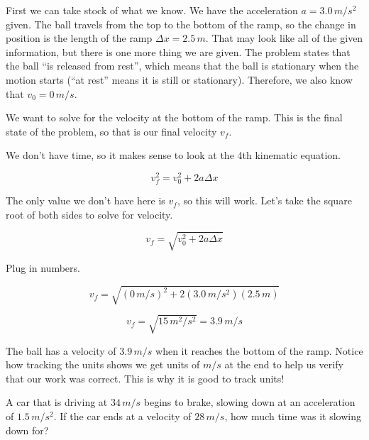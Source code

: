 \documentclass[12pt]{book}
\begin{document}
\hspace{10pt}

First we can take stock of what we know. We have the acceleration $a = 3.0 \, m/s^2$ given. The ball travels from the top to the bottom of the ramp, so the change in position is the length of the ramp $\Delta x = 2.5 \, m$. That may look like all of the given information, but there is one more thing we are given. The problem states that the ball ``is released from rest'', which means that the ball is stationary when the motion starts (``at rest'' means it is still or stationary). Therefore, we also know that $v_0 = 0 \, m/s$.

We want to solve for the velocity at the bottom of the ramp. This is the final state of the problem, so that is our final velocity $v_f$.

We don't have time, so it makes sense to look at the 4th kinematic equation.

\begin{equation}
v_f^2 = v_0^2 + 2 a \Delta x
\end{equation}

The only value we don't have here is $v_f$, so this will work. Let's take the square root of both sides to solve for velocity.

\begin{equation}
v_f = \sqrt{v_0^2 + 2 a \Delta x}
\end{equation}

Plug in numbers.

\begin{equation}
v_f = \sqrt{(0 \, m/s)^2 + 2 (3.0 \, m/s^2) (2.5 \, m)}
\end{equation}

\begin{equation}
v_f = \sqrt{15 \, m^2 / s^2} = 3.9 \, m/s
\end{equation}

The ball has a velocity of $3.9 \, m/s$ when it reaches the bottom of the ramp. Notice how tracking the units shows we get units of $m/s$ at the end to help us verify that our work was correct. This is why it is good to track units!

\linespace

\example

A car that is driving at $34 \, m/s$ begins to brake, slowing down at an acceleration of $1.5 \, m/s^2$. If the car ends at a velocity of $28 \, m/s$, how much time was it slowing down for?

\hspace{10pt}
\end{document}
